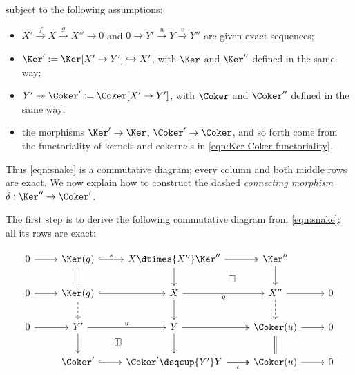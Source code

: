 subject to the following assumptions:
\begin{itemize}
	\item $X'\xrightarrow{f}X\xrightarrow{g}X''\to0$ and
	$0\to Y'\xrightarrow{u}Y\xrightarrow{v}Y''$ are given exact sequences;
	\item $\Ker':=\Ker[X'\to Y']\hookrightarrow X'$, with $\Ker$ and
	$\Ker''$ defined in the same way;
	\item $Y'\twoheadrightarrow\Coker':=\Coker[X'\to Y']$, with $\Coker$ and
	$\Coker''$ defined in the same way;
	\item the morphisms $\Ker'\to\Ker$, $\Coker'\to\Coker$, and so forth come
	from the functoriality of kernels and cokernels in
	\eqref{eqn:Ker-Coker-functoriality}.
\end{itemize}

Thus \eqref{eqn:snake} is a commutative diagram; every column and both middle
rows are exact. We now explain how to construct the dashed \emph{connecting
morphism} $\delta:\Ker''\to\Coker'$.

The first step is to derive the following commutative diagram from
\eqref{eqn:snake}; all its rows are exact:

\begin{equation}\label{eqn:snake-conn}
\begin{tikzcd}
	0 \arrow[r] & \Ker(g) \arrow[hookrightarrow, r, "s"] \arrow[equal, d] & X \dtimes{X''} \Ker'' \arrow[twoheadrightarrow, r] \arrow[d] \arrow[phantom, rd, "\Box" description] & \Ker'' \arrow[d] & \\
	0 \arrow[r] & \Ker(g) \arrow[hookrightarrow, r] \arrow[dashrightarrow, d] & X \arrow[r, "g"'] \arrow[d] & X'' \arrow[dashrightarrow, d] \arrow[r] & 0 \\
	0 \arrow[r] & Y' \arrow[r, "u"] \arrow[d] & Y \arrow[twoheadrightarrow, r] \arrow[d] & \Coker(u) \arrow[equal, d] \arrow[r] & 0 \\
	& \Coker' \arrow[hookrightarrow, r] & \Coker' \dsqcup{Y'} Y \arrow[r] \arrow[phantom, lu, "\boxplus" description] \arrow[twoheadrightarrow, r, "t"'] & \Coker(u) \arrow[r] & 0
\end{tikzcd}
\end{equation}


